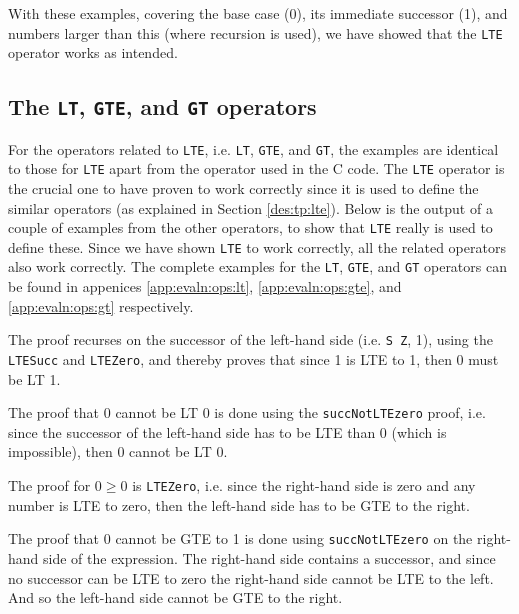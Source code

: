         With these examples, covering the base case (0), its immediate successor (1), and numbers larger than this (where recursion is used), we have showed that the \texttt{LTE} operator works as intended.
   
   \subsection{The \texttt{LT}, \texttt{GTE}, and \texttt{GT} operators}\label{evaln:ops:lt-gte-gt}
        For the operators related to \texttt{LTE}, i.e. \texttt{LT}, \texttt{GTE}, and \texttt{GT}, the examples are identical to those for \texttt{LTE} apart from the operator used in the C code. The \texttt{LTE} operator is the crucial one to have proven to work correctly since it is used to define the similar operators (as explained in Section \ref{des:tp:lte}). Below is the output of a couple of examples from the other operators, to show that \texttt{LTE} really is used to define these. Since we have shown \texttt{LTE} to work correctly, all the related operators also work correctly. The complete examples for the \texttt{LT}, \texttt{GTE}, and \texttt{GT} operators can be found in appenices \ref{app:evaln:ops:lt}, \ref{app:evaln:ops:gte}, and \ref{app:evaln:ops:gt} respectively.
        
        
        The proof recurses on the successor of the left-hand side (i.e. \texttt{S Z}, 1), using the \texttt{LTESucc} and \texttt{LTEZero}, and thereby proves that since 1 is LTE to 1, then 0 must be LT 1.
        
        
        The proof that 0 cannot be LT 0 is done using the \texttt{succNotLTEzero} proof, i.e. since the successor of the left-hand side has to be LTE than 0 (which is impossible), then 0 cannot be LT 0.
        
        
        The proof for $0 \geq 0$ is \texttt{LTEZero}, i.e. since the right-hand side is zero and any number is LTE to zero, then the left-hand side has to be GTE to the right.
        
        
        The proof that 0 cannot be GTE to 1 is done using \texttt{succNotLTEzero} on the right-hand side of the expression. The right-hand side contains a successor, and since no successor can be LTE to zero the right-hand side cannot be LTE to the left. And so the left-hand side cannot be GTE to the right.
        
